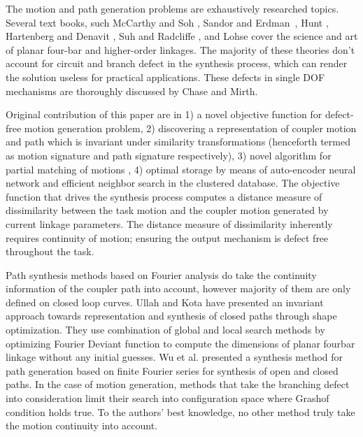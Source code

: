\documentclass[twocolumn,10pt]{asme2e}
\begin{document}
The motion and path generation problems are exhaustively researched topics.
Several text books, such McCarthy and Soh \cite{sohmccarthy}, Sandor and Erdman~\cite{Sandor}, Hunt \cite{Hunt78}, Hartenberg and Denavit \cite{Hartenberg},  Suh and Radcliffe \cite{Suh78}, and Lohse \cite{lohse2013} cover the science and art of planar four-bar and higher-order linkages.
The majority of these theories don't account for circuit and branch defect in the synthesis process, which can render the solution useless for practical applications.
These defects in single DOF mechanisms are thoroughly discussed by Chase and Mirth\cite{chasemirth}.

Original contribution of this paper are in 1) a novel objective function for defect-free motion generation problem, 2) discovering a representation of coupler motion and path which is invariant under similarity transformations (henceforth termed as motion signature and path signature respectively), 3) novel algorithm for partial matching of motions , 4) optimal storage by means of auto-encoder neural network and efficient neighbor search in the clustered database.
The objective function that drives the synthesis process computes a distance measure of dissimilarity between the task motion and the coupler motion generated by current linkage parameters.
The distance measure of dissimilarity inherently requires continuity of motion; ensuring the output mechanism is defect free throughout the task.


Path synthesis methods based on Fourier analysis do take the continuity information of the coupler path into account, however majority of them are only defined on closed loop curves.
Ullah and Kota\cite{ullah1997} have presented an invariant approach towards representation and synthesis of closed paths through shape optimization. They use combination of global and local search methods by optimizing Fourier Deviant function to compute the dimensions of planar fourbar linkage without any initial guesses.
Wu et al.\cite{wu2011} presented a synthesis method for path generation based on finite Fourier series for synthesis of open and closed paths.
In the case of motion generation, methods that take the branching defect into consideration limit their search into configuration space where Grashof condition holds true.
To the authors' best knowledge, no other method truly take the motion continuity into account.
\end{document}
